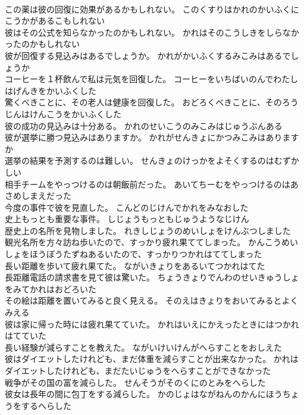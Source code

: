 \documentclass[8pt]{extreport}
\begin{document}
\begin{CJK}{UTF8}{min}
\\	この薬は彼の回復に効果があるかもしれない。	このくすりはかれのかいふくにこうかがあるこもしれない 
\\	彼はその公式を知らなかったのかもしれない。	かれはそのこうしきをしらなかったのかもしれない 
\\	彼が回復する見込みはあるでしょうか。	かれがかいふくするみこみはあるでしょうか 
\\	コーヒーを１杯飲んで私は元気を回復した。	コーヒーをいちばいのんでわたしはげんきをかいふくした 
\\	驚くべきことに、その老人は健康を回復した。	おどろくべきことに、そのろうじんはけんこうをかいふくした 
\\	彼の成功の見込みは十分ある。	かれのせいこうのみこみはじゅうぶんある 
\\	彼が選挙に勝つ見込みはありますか。	かれがせんきょにかつみこみはありますか 
\\	選挙の結果を予測するのは難しい。	せんきょのけっかをよそくするのはむずかしい 
\\	相手チームをやっつけるのは朝飯前だった。	あいてちーむをやっつけるのはあさめしまえだった 
\\	今度の事件で彼を見直した。	こんどのじけんでかれをみなおした 
\\	史上もっとも重要な事件。	しじょうもっともじゅうようなじけん 
\\	歴史上の名所を見物しました。	れきしじょうのめいしょをけんぶつしました 
\\	観光名所を方々訪ね歩いたので、すっかり疲れ果ててしまった。	かんこうめいしょをほうぼうたずねあるいたので、すっかりつかれはててしまった 
\\	長い距離を歩いて疲れ果てた。	ながいきょりをあるいてつかれはてた 
\\	長距離電話の請求書を見て彼は驚いた。	ちょうきょりでんわのせいきゅうしょをみてかれはおどろいた 
\\	その絵は距離を置いてみると良く見える。	そのえはきょりをおいてみるとよくみえる 
\\	彼は家に帰った時には疲れ果てていた。	かれはいえにかえったときにはつかれはてていた 
\\	長い経験が減らすことを教えた。	ながいけいけんがへらすことをおしえた 
\\	彼はダイエットしたけれども、まだ体重を減らすことが出来なかった。	かれはダイエットしたけれども、まだたいじゅうをへらすことができなかった 
\\	戦争がその国の富を減らした。	せんそうがそのくにのとみをへらした 
\\	彼女は長年の間に包丁をする減らした。	かのじょはながねんのかんにほうちょうをするへらした 

\end{CJK}
\end{document}
